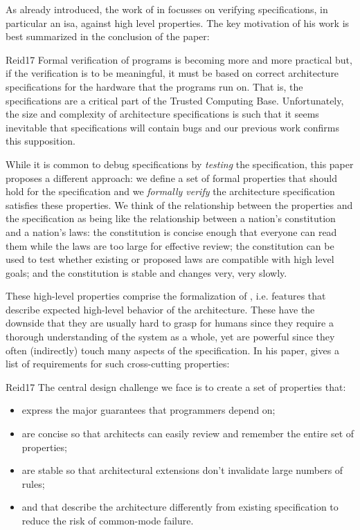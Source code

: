 As already introduced, the work of \citeauthor{Reid17} in  \cite{Reid17} focusses on verifying specifications, in particular an \gls{isa}, against high level properties.
The key motivation of his work is best summarized in the conclusion of the paper:
\begin{displaycquote}[p.88:22]{Reid17}
    Formal verification of programs is becoming more and more practical but, if the verification is to be meaningful, it must be based on correct architecture specifications for the hardware that the programs run on.
    That is, the specifications are a critical part of the Trusted Computing Base.
    Unfortunately, the size and complexity of architecture specifications is such that it seems inevitable that specifications will contain bugs and our previous work confirms this supposition.

    While it is common to debug specifications by \textit{testing} the specification, this paper proposes a different approach:
    we define a set of formal properties that should hold for the specification and we \textit{formally verify} the architecture specification satisfies these properties.
    We think of the relationship between the properties and the specification as being like the relationship between a nation's constitution and a nation's laws:
    the constitution is concise enough that everyone can read them while the laws are too large for effective review; the constitution can be used to test whether existing or proposed laws are compatible with high level goals; and the constitution is stable and changes very, very slowly.
\end{displaycquote}

These high-level properties comprise the formalization of , i.e. features that describe expected high-level behavior of the architecture.
These have the downside that they are usually hard to grasp for humans since they require a thorough understanding of the system as a whole, yet are powerful since they often (indirectly) touch many aspects of the specification.
In his paper, \citeauthor{Reid17} gives a list of requirements for such cross-cutting properties:
\begin{displaycquote}[pp.88:2-3]{Reid17}
    The central design challenge we face is to create a set of properties that:
    \begin{itemize}
        \item express the major guarantees that programmers depend on;
        \item are concise so that architects can easily review and remember the entire set of properties;
        \item are stable so that architectural extensions don't invalidate large numbers of rules;
        \item and that describe the architecture differently from existing specification to reduce the risk of common-mode failure.
    \end{itemize}
\end{displaycquote}

